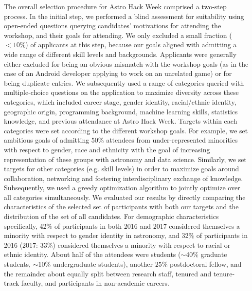 \documentclass{aastex62}
\begin{document}
The overall selection procedure for Astro Hack Week comprised a two-step process. In the initial step, we performed a blind assessment for suitability using open-ended questions querying candidates' motivations for attending the workshop, and their goals for attending. We only excluded a small fraction ($<10\%$) of applicants at this step, because our goals aligned with admitting a wide range of different skill levels and backgrounds. Applicants were generally either excluded for being an obvious mismatch with the workshop goals (as in the case of an Android developer applying to work on an unrelated game) or for being duplicate entries. We subsequently used a range of categories queried with multiple-choice questions  on the application to maximize diversity across these categories, which included career stage, gender identity, racial/ethnic identity, geographic origin, programming background, machine learning skills, statistics knowledge, and previous attendance at Astro Hack Week. Targets within each categories were set according to the different workshop goals. For example, we set ambitious goals of admitting 50\% attendees from under-represented minorities with respect to gender, race and ethnicity with the goal of increasing representation of these groups with astronomy and data science. Similarly, we set targets for other categories (e.g. skill levels) in order to maximize goals around collaboration, networking and fostering interdisciplinary exchange of knowledge. Subsequently, we used a greedy optimization algorithm to jointly optimize over all categories simultaneously. We evaluated our results by directly comparing the characteristics of the selected set of participants with both our targets and the distribution of the set of all candidates. For demographic characteristics specifically, 42\% of participants in both 2016 and 2017 considered themselves a minority with respect to gender identity in astronomy, and 32\% of participants in 2016 (2017: 33\%) considered themselves a minority with respect to racial or ethnic identity. About half of the attendees were students ($\sim$40\% graduate students, $\sim$10\% undergraduate students), another $25\%$ postdoctoral fellow, and the remainder about equally split between research staff, tenured and tenure-track faculty, and participants in non-academic careers.
\end{document}
